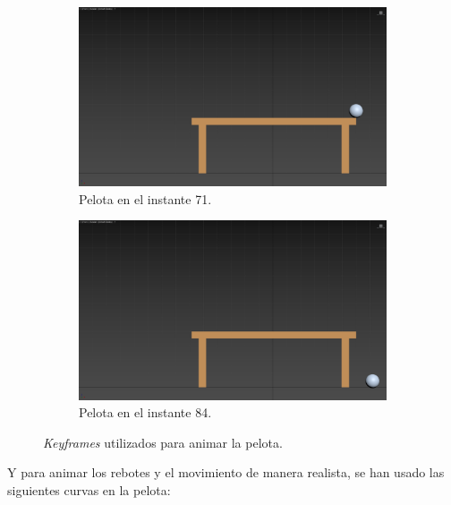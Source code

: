 \documentclass{article}
\begin{document}
\newpage
\begin{figure}[H]\ContinuedFloat
    \centering
    \begin{subfigure}[H]{0.48\textwidth}
        \centering
        \includegraphics[width=\textwidth]{imagenes/Ejercicio3/keyframes/71.png}
        \caption{Pelota en el instante 71.}
    \end{subfigure}
    \hfill
    \begin{subfigure}[H]{0.48\textwidth}
        \centering
        \includegraphics[width=\textwidth]{imagenes/Ejercicio3/keyframes/84.png}
        \caption{Pelota en el instante 84.}
    \end{subfigure}
    \caption{\textit{Keyframes} utilizados para animar la pelota.}
\end{figure}
Y para animar los rebotes y el movimiento de manera realista, se han usado las siguientes curvas en la pelota:
\end{document}
